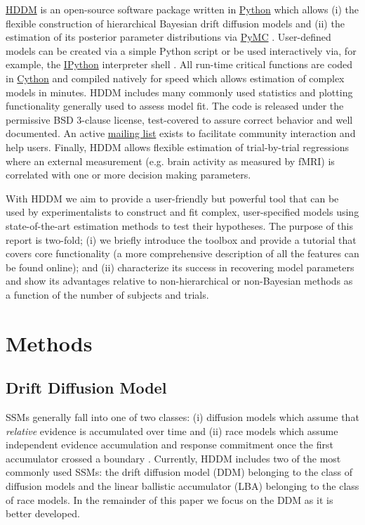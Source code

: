 \documentclass[letterpaper,10pt,english]{article}
\begin{document}
\href{http://github.com/twiecki/hddm}{HDDM} is an open-source software package written in \href{http://www.python.org/}{Python} which allows (i) the flexible construction of hierarchical Bayesian drift diffusion models and (ii) the estimation of its posterior parameter distributions via \href{http://code.google.com/p/pymc/}{PyMC} \citep{PatilHuardFonnesbeck10}. User-defined models can be created via a simple Python script or be used interactively via, for example, the \href{http://ipython.org}{IPython} interpreter shell \citep{PerezGranger07}. All run-time critical functions are coded in \href{http://www.cython.org/}{Cython} \citep{BehnelBradshawCitroEtAl11} and compiled natively for speed which allows estimation of complex models in minutes. HDDM includes many commonly used statistics and plotting functionality generally used to assess model fit. The code is released under the permissive BSD 3-clause license, test-covered to assure correct behavior and well documented. An active \href{https://groups.google.com/group/hddm-users/}{mailing list} exists to facilitate community interaction and help users. Finally, HDDM allows flexible estimation of trial-by-trial regressions where an external measurement (e.g. brain activity as measured by fMRI) is correlated with one or more decision making
parameters.

With HDDM we aim to provide a user-friendly but powerful tool that can be used by experimentalists to construct and fit complex, user-specified models using state-of-the-art estimation methods to test their hypotheses. The purpose of this report is two-fold; (i) we briefly introduce the toolbox and provide a tutorial that covers core functionality (a more comprehensive description of all the features can be found online); and (ii) characterize its success in recovering model parameters and show its advantages relative to non-hierarchical or non-Bayesian methods as a function of the number of subjects and trials.


\section*{Methods}
\label{methods:ipython}\label{methods:index-0}\label{methods::doc}\label{methods:methods}\label{methods:chap-methods}

\subsection*{Drift Diffusion Model}
\label{methods:sequential-sampling-models}
SSMs generally fall into one of two classes: (i) diffusion models
which assume that \emph{relative} evidence is accumulated over time
and (ii) race models which assume independent evidence accumulation
and response commitment once the first accumulator crossed a boundary
\citep{LaBerge62,Vickers70}. Currently, HDDM includes two of the most
commonly used SSMs: the drift diffusion model (DDM)
\citep{RatcliffRouder98,RatcliffMcKoon08} belonging to the
class of diffusion models and the linear ballistic accumulator (LBA)
\citep{BrownHeathcote08} belonging to the class of race models. In the remainder of this paper we focus on the DDM as it is better developed.
\end{document}
